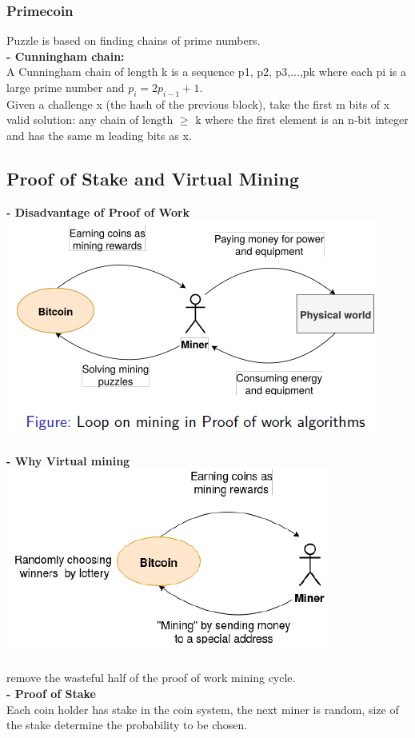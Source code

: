 \documentclass{article}
\begin{document}
\subsubsection{Primecoin}
Puzzle is based on finding chains of prime numbers.\\
\textbf{- Cunningham chain: }\\
A Cunningham chain of length k is a sequence p1, p2, p3,...,pk where each pi is a large prime number and $p_i = 2p_{i-1} + 1$.\\
Given a challenge x (the hash of the previous block), take the first m bits of x
valid solution: any chain of length $\geq$ k where the first element is an n-bit integer and has the same m leading bits as x.\\

\subsection{Proof of Stake and Virtual Mining}
\textbf{- Disadvantage of Proof of Work}\\
\includegraphics[scale=0.7]{43.png}\\\\
\textbf{- Why Virtual mining}\\
\includegraphics[scale=0.7]{44.png}\\\\
remove the wasteful half of the proof of work mining cycle.\\
\textbf{- Proof of Stake}\\
Each coin holder has stake in the coin system, the next miner is random, size of the stake determine the probability to be chosen.\\
\end{document}
